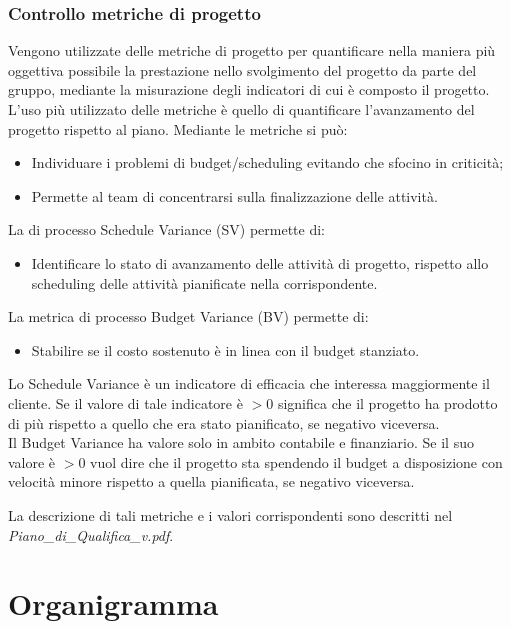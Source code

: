 \subsubsection{Controllo metriche di progetto}
Vengono utilizzate delle metriche di progetto per quantificare nella maniera più oggettiva possibile la prestazione nello svolgimento del progetto da parte del gruppo, mediante la misurazione degli indicatori di cui è composto il progetto. L'uso più utilizzato delle metriche è quello di quantificare l'avanzamento del progetto rispetto al piano. Mediante le metriche si può:
\begin{itemize}
\item Individuare i problemi di budget/scheduling evitando che sfocino in criticità;
\item Permette al team di concentrarsi sulla finalizzazione delle attività.
\end{itemize}
La  di processo Schedule Variance (SV) permette di:
\begin{itemize}
\item Identificare lo stato di avanzamento delle attività di progetto,  rispetto allo scheduling delle attività pianificate nella  corrispondente.
\end{itemize}
La metrica di processo Budget Variance (BV) permette di:
\begin{itemize}
\item Stabilire se il costo sostenuto è in linea con il budget stanziato.
\end{itemize}
Lo Schedule Variance è un indicatore di efficacia che interessa maggiormente il cliente. Se il valore di tale indicatore è $>{0}$ significa che il progetto ha prodotto di più rispetto a quello che era stato pianificato, se negativo viceversa.\\
Il Budget Variance ha valore solo in ambito contabile e finanziario. Se il suo valore è $>{0}$ vuol dire che il progetto sta spendendo il budget a disposizione con velocità minore rispetto a quella pianificata, se negativo viceversa.

La descrizione di tali metriche e i valori corrispondenti sono descritti nel \emph{Piano\_{}di\_{}Qualifica\_{}v\versioneNormeDiProgetto{}.pdf}.

\newpage
\appendix

\section{Organigramma}%
\label{1.0}
